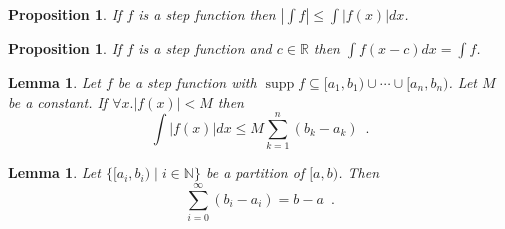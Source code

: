 \documentclass{book}
\newtheorem{prop}[ax]{Proposition}
\newtheorem{lm}[ax]{Lemma}
\theoremstyle{definition}
\newcommand{\supp}{\ensuremath{\operatorname{supp}}}
\begin{document}
\begin{prop}
If $f$ is a step function then $\left| \int f \right| \leq \int |f(x)|dx$.
\end{prop}

\begin{prop}
If $f$ is a step function and $c \in \mathbb{R}$ then $\int f(x-c)dx = \int f$.
\end{prop}

\begin{lm}
Let $f$ be a step function with $\supp f \subseteq [a_1, b_1) \cup \cdots \cup [a_n, b_n)$. Let $M$ be a constant. If $\forall x. |f(x)| < M$ then
\[ \int |f(x)| dx \leq M \sum_{k=1}^n (b_k - a_k) \enspace . \]
\end{lm}

\begin{lm}
\label{lm:sum_of_interval_lengths}
Let $\{ [a_i, b_i) \mid i \in \mathbb{N} \}$ be a partition of $[a,b)$. Then
\[ \sum_{i=0}^\infty (b_i - a_i) = b - a \enspace . \]
\end{lm}
\end{document}

